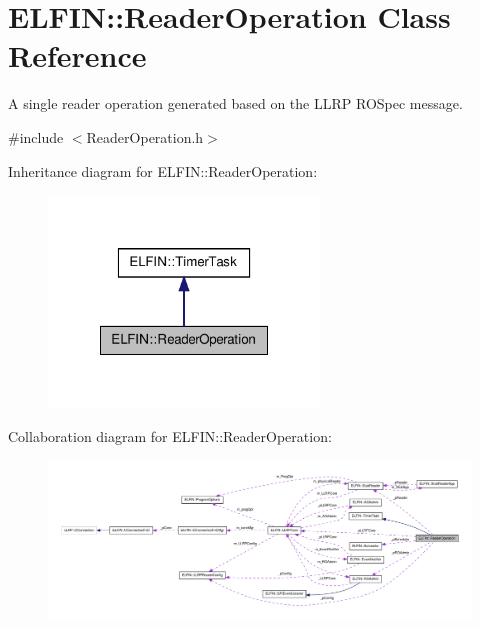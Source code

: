 \hypertarget{class_e_l_f_i_n_1_1_reader_operation}{\section{E\-L\-F\-I\-N\-:\-:Reader\-Operation Class Reference}
\label{class_e_l_f_i_n_1_1_reader_operation}
}


A single reader operation generated based on the L\-L\-R\-P R\-O\-Spec message.  




{\ttfamily \#include $<$Reader\-Operation.\-h$>$}



Inheritance diagram for E\-L\-F\-I\-N\-:\-:Reader\-Operation\-:
\nopagebreak
\begin{figure}[H]
\begin{center}
\leavevmode
\includegraphics[width=204pt]{class_e_l_f_i_n_1_1_reader_operation__inherit__graph}
\end{center}
\end{figure}


Collaboration diagram for E\-L\-F\-I\-N\-:\-:Reader\-Operation\-:
\nopagebreak
\begin{figure}[H]
\begin{center}
\leavevmode
\includegraphics[width=350pt]{class_e_l_f_i_n_1_1_reader_operation__coll__graph}
\end{center}
\end{figure}
